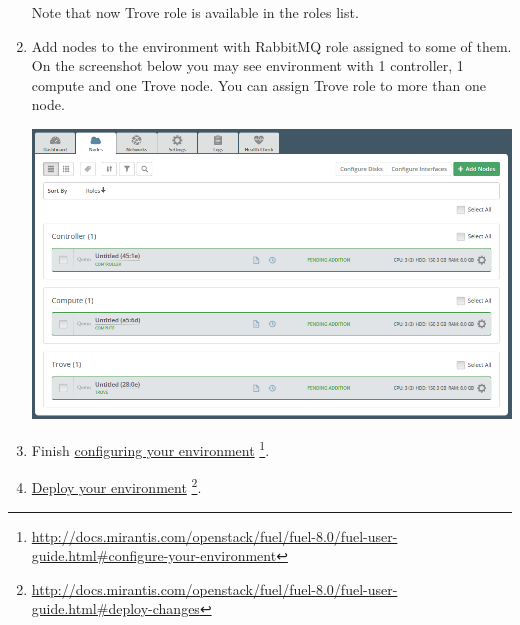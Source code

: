 \documentclass[letterpaper,10pt,english]{sphinxmanual}
\begin{document}
\begin{enumerate}
Note that now Trove role is available in the roles list.

\item {} 
Add nodes to the environment with RabbitMQ role assigned to some of them.
On the screenshot below you may see environment with 1 controller, 1 compute
and one Trove node. You can assign Trove role to more than one
node.

\includegraphics{env_nodes.png}

\item {} 
Finish \href{http://docs.mirantis.com/openstack/fuel/fuel-8.0/fuel-user-guide.html\#configure-your-environment}{configuring your environment} \footnote{
\href{http://docs.mirantis.com/openstack/fuel/fuel-8.0/fuel-user-guide.html\#configure-your-environment}{http://docs.mirantis.com/openstack/fuel/fuel-8.0/fuel-user-guide.html\#configure-your-environment}
}.

\item {} 
\href{http://docs.mirantis.com/openstack/fuel/fuel-8.0/fuel-user-guide.html\#deploy-changes}{Deploy your environment} \footnote{
\href{http://docs.mirantis.com/openstack/fuel/fuel-8.0/fuel-user-guide.html\#deploy-changes}{http://docs.mirantis.com/openstack/fuel/fuel-8.0/fuel-user-guide.html\#deploy-changes}
}.

\end{enumerate}
\end{document}
